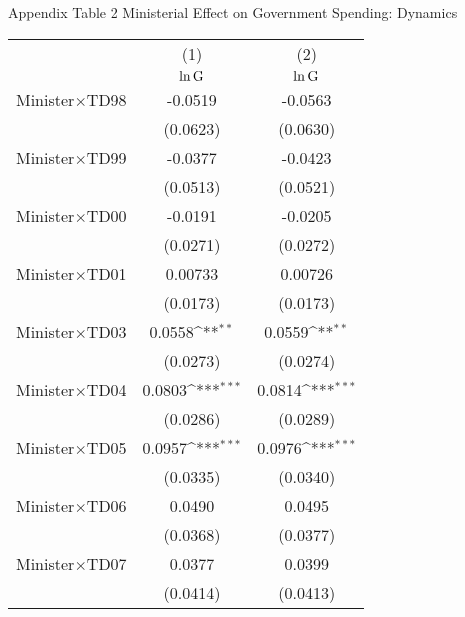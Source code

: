 \documentclass[11pt,a4paper]{article}
\begin{document}
\newpage
\begin{center}
Appendix Table 2 Ministerial Effect on Government Spending: Dynamics \\
\medskip
\begin{scriptsize}
{
\def\sym#1{\ifmmode^{#1}\else\(^{#1}\)\fi}
\begin{tabular}{l*{2}{c}}
\hline\hline
            &\multicolumn{1}{c}{(1)}&\multicolumn{1}{c}{(2)}\\
            &\multicolumn{1}{c}{\(\rm \ln{G}  \)}&\multicolumn{1}{c}{\(\rm \ln{G}  \)}\\
\hline
Minister\(\times\)TD98       &     -0.0519           &     -0.0563         \\
            &    (0.0623)             &    (0.0630)         \\
[1em]
Minister\(\times\)TD99       &     -0.0377         &     -0.0423         \\
            &    (0.0513)             &    (0.0521)         \\
[1em]
Minister\(\times\)TD00       &     -0.0191         &     -0.0205         \\
            &    (0.0271)             &    (0.0272)         \\
[1em]
Minister\(\times\)TD01       &     0.00733           &     0.00726         \\
            &    (0.0173)            &    (0.0173)         \\
[1em]
Minister\(\times\)TD03       &      0.0558\sym{**}      &      0.0559\sym{**} \\
            &    (0.0273)          &    (0.0274)         \\
[1em]
Minister\(\times\)TD04       &      0.0803\sym{***}&   0.0814\sym{***}\\
            &    (0.0286)            &    (0.0289)         \\
[1em]
Minister\(\times\)TD05       &      0.0957\sym{***}  &      0.0976\sym{***}\\
            &    (0.0335)              &    (0.0340)         \\
[1em]
Minister\(\times\)TD06       &      0.0490        &      0.0495         \\
            &    (0.0368)           &    (0.0377)         \\
[1em]
Minister\(\times\)TD07       &      0.0377           &      0.0399         \\
            &    (0.0414)         &    (0.0413)         \\

\end{tabular}}
\end{scriptsize}
\end{center}
\end{document}
